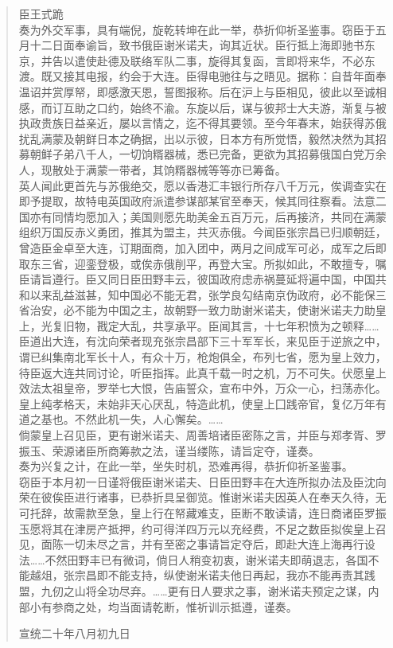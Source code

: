 \begin{quote}
	臣王式跪\\

奏为外交军事，具有端倪，旋乾转坤在此一举，恭折仰祈圣鉴事。窃臣于五月十二日面奉谕旨，致书俄臣谢米诺夫，询其近状。臣行抵上海即驰书东京，并告以遣使赴德及联络军队二事，旋得其复函，言即将来华，不必东渡。既又接其电报，约会于大连。臣得电驰往与之晤见。据称：自昔年面奉温诏并赏厚帑，即感激天恩，誓图报称。后在沪上与臣相见，彼此以至诚相感，而订互助之口约，始终不渝。东旋以后，谋与彼邦士大夫游，渐复与被执政贵族日益亲近，屡以言情之，迄不得其要领。至今年春末，始获得苏俄扰乱满蒙及朝鲜日本之确据，出以示彼，日本方有所觉悟，毅然决然为其招募朝鲜子弟八千人，一切饷糈器械，悉已完备，更欲为其招募俄国白党万余人，现散处于满蒙一带者，其饷糈器械等等亦已筹备。\\

英人闻此更首先与苏俄绝交，愿以香港汇丰银行所存八千万元，俟调查实在即予提取，故特电英国政府派遣参谋部某官至奉天，候其同往察看。法意二国亦有同情均愿加入；美国则愿先助美金五百万元，后再接济，共同在满蒙组织万国反赤义勇团，推其为盟主，共灭赤俄。今闻臣张宗昌已归顺朝廷，曾造臣金卓至大连，订期面商，加入团中，两月之间成军可必，成军之后即取东三省，迎銮登极，或俟赤俄削平，再登大宝。所拟如此，不敢擅专，嘱臣请旨遵行。臣又同日臣田野丰云，彼国政府虑赤祸蔓延将遍中国，中国共和以来乱益滋甚，知中国必不能无君，张学良勾结南京伪政府，必不能保三省治安，必不能为中国之主，故朝野一致力助谢米诺夫，使谢米诺夫力助皇上，光复旧物，戡定大乱，共享承平。臣闻其言，十七年积愤为之顿释……臣道出大连，有沈向荣者现充张宗昌部下三十军军长，来见臣于逆旅之中，谓已纠集南北军长十人，有众十万，枪炮俱全，布列七省，愿为皇上效力，待臣返大连共同讨论，听臣指挥。此真千载一时之机，万不可失。伏愿皇上效法太祖皇帝，罗举七大恨，告庙誓众，宣布中外，万众一心，扫荡赤化。皇上纯孝格天，未始非天心厌乱，特造此机，使皇上囗践帝官，复亿万年有道之基也。不然此机一失，人心懈矣。……\\

倘蒙皇上召见臣，更有谢米诺夫、周善培诸臣密陈之言，并臣与郑孝胥、罗振玉、荣源诸臣所商筹款之法，谨当缕陈，请旨定夺，谨奏。\\

奏为兴复之计，在此一举，坐失时机，恐难再得，恭折仰祈圣鉴事。\\

窃臣于本月初一日谨将俄臣谢米诺夫、日臣田野丰在大连所拟办法及臣沈向荣在彼俟臣进行诸事，已恭折具呈御览。惟谢米诺夫因英人在奉天久待，无可托辞，故需款至急，皇上行在帑藏难支，臣断不敢读请，连日商诸臣罗振玉愿将其在津房产抵押，约可得洋四万元以充经费，不足之数臣拟俟皇上召见，面陈一切未尽之言，并有至密之事请旨定夺后，即赴大连上海再行设法……不然田野丰已有微词，倘日人稍变初衷，谢米诺夫即萌退志，各国不能越俎，张宗昌即不能支持，纵使谢米诺夫他日再起，我亦不能再责其践盟，九仞之山将全功尽弃。……更有日人要求之事，谢米诺夫预定之谋，内部小有参商之处，均当面请乾断，惟祈训示抵遵，谨奏。\\

\begin{flushright}
	宣统二十年八月初九日\\
\end{flushright}
\end{quote}

